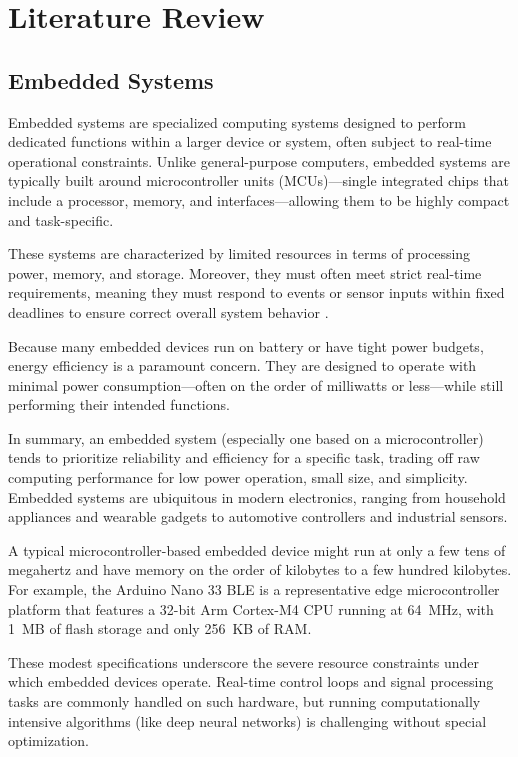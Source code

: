 \chapter{Literature Review}




\section{Embedded Systems}

Embedded systems are specialized computing systems designed to perform dedicated functions within a larger device or system, often subject to real-time operational constraints. Unlike general-purpose computers, embedded systems are typically built around microcontroller units (MCUs)---single integrated chips that include a processor, memory, and interfaces---allowing them to be highly compact and task-specific.

These systems are characterized by limited resources in terms of processing power, memory, and storage. Moreover, they must often meet strict real-time requirements, meaning they must respond to events or sensor inputs within fixed deadlines to ensure correct overall system behavior \cite{techtarget_embedded_system}.

Because many embedded devices run on battery or have tight power budgets, energy efficiency is a paramount concern. They are designed to operate with minimal power consumption---often on the order of milliwatts or less---while still performing their intended functions.

In summary, an embedded system (especially one based on a microcontroller) tends to prioritize reliability and efficiency for a specific task, trading off raw computing performance for low power operation, small size, and simplicity. Embedded systems are ubiquitous in modern electronics, ranging from household appliances and wearable gadgets to automotive controllers and industrial sensors.

A typical microcontroller-based embedded device might run at only a few tens of megahertz and have memory on the order of kilobytes to a few hundred kilobytes. For example, the Arduino Nano 33 BLE is a representative edge microcontroller platform that features a 32-bit Arm Cortex-M4 CPU running at 64~MHz, with 1~MB of flash storage and only 256~KB of RAM.

These modest specifications underscore the severe resource constraints under which embedded devices operate. Real-time control loops and signal processing tasks are commonly handled on such hardware, but running computationally intensive algorithms (like deep neural networks) is challenging without special optimization.


